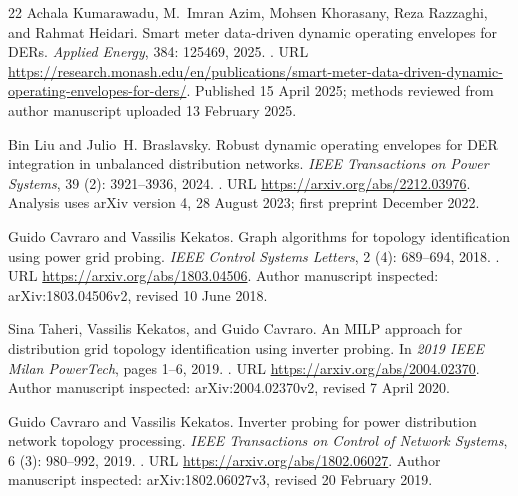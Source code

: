 \documentclass[UTF8,11pt,fontset=fandol]{ctexart}
\theoremstyle{remark}
\numberwithin{equation}{section}
\begin{document}
\begin{thebibliography}{22}
Achala Kumarawadu, M.~Imran Azim, Mohsen Khorasany, Reza Razzaghi, and Rahmat
  Heidari.
\newblock Smart meter data-driven dynamic operating envelopes for {DERs}.
\newblock \emph{Applied Energy}, 384: 125469, 2025.
\newblock {}.
\newblock URL
  \url{https://research.monash.edu/en/publications/smart-meter-data-driven-dynamic-operating-envelopes-for-ders/}.
\newblock Published 15 April 2025; methods reviewed from author manuscript
  uploaded 13 February 2025.

Bin Liu and Julio~H. Braslavsky.
\newblock Robust dynamic operating envelopes for {DER} integration in
  unbalanced distribution networks.
\newblock \emph{IEEE Transactions on Power Systems}, 39 (2):
  3921--3936, 2024.
\newblock {}.
\newblock URL \url{https://arxiv.org/abs/2212.03976}.
\newblock Analysis uses arXiv version 4, 28 August 2023; first preprint
  December 2022.

Guido Cavraro and Vassilis Kekatos.
\newblock Graph algorithms for topology identification using power grid
  probing.
\newblock \emph{IEEE Control Systems Letters}, 2 (4):
  689--694, 2018.
\newblock {}.
\newblock URL \url{https://arxiv.org/abs/1803.04506}.
\newblock Author manuscript inspected: arXiv:1803.04506v2, revised 10 June
  2018.

Sina Taheri, Vassilis Kekatos, and Guido Cavraro.
\newblock An {MILP} approach for distribution grid topology identification
  using inverter probing.
\newblock In \emph{2019 IEEE Milan PowerTech}, pages 1--6, 2019.
\newblock {}.
\newblock URL \url{https://arxiv.org/abs/2004.02370}.
\newblock Author manuscript inspected: arXiv:2004.02370v2, revised 7 April
  2020.

Guido Cavraro and Vassilis Kekatos.
\newblock Inverter probing for power distribution network topology processing.
\newblock \emph{IEEE Transactions on Control of Network Systems}, 6
  (3): 980--992, 2019.
\newblock {}.
\newblock URL \url{https://arxiv.org/abs/1802.06027}.
\newblock Author manuscript inspected: arXiv:1802.06027v3, revised 20 February
  2019.


\end{thebibliography}
\end{document}
